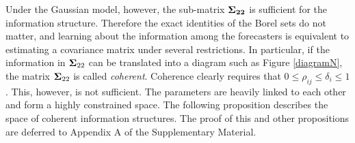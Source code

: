 \documentclass[12pt]{article}
\theoremstyle{definition}
\newtheorem{example}[theorem]{Example}
\theoremstyle{definition}
\begin{document}
Under the Gaussian model, however, the sub-matrix ${\bf \Sigma_{22}}$ is sufficient for the information structure. Therefore the exact identities of the Borel sets do not matter, and learning about the
information among the forecasters is equivalent to estimating a
covariance matrix under several restrictions.  In particular, if the
information in ${\bf\Sigma}_{22}$ can be translated into a diagram
such as Figure \ref{diagramN},
the matrix ${\bf\Sigma}_{22}$ is called \textit{coherent}.  Coherence
clearly requires that $0 \leq \rho_{ij} \leq \delta_i \leq 1$.  This, however, is not sufficient. The parameters are heavily linked to each other and form a highly constrained space. 
%
The following proposition describes the space of coherent information structures.
 The proof of this and other propositions are deferred to Appendix A of the Supplementary Material.
\end{document}
